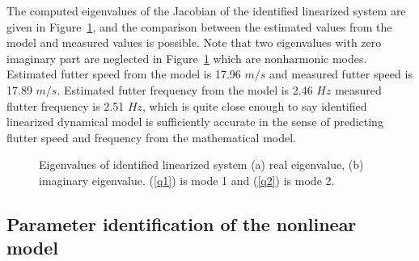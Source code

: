 \documentclass[openacc]{rsproca_new}%
\newcommand{\Fref}[1]{Figure~\ref{#1}}
\begin{document}
The computed eigenvalues of the Jacobian of the identified linearized system are given in \Fref{f:7}, and the comparison between the estimated values from the model and measured values is possible. Note that two eigenvalues with zero imaginary part are neglected in \Fref{f:7} which are nonharmonic modes. Estimated futter speed from the model is 17.96 $m/s$ and measured futter speed is 17.89 $m/s$. Estimated futter frequency from the model is 2.46 $Hz$ measured flutter frequency is 2.51 $Hz$, which is quite close enough to say identified linearized dynamical model is sufficiently accurate in the sense of predicting flutter speed and frequency from the mathematical model.

\begin{figure}
  \centering
\caption{Eigenvalues of identified linearized system (a) real eigenvalue, (b) imaginary eigenvalue. (\ref{q1}) is mode 1 and (\ref{q2}) is mode 2.}
\label{f:7}
\end{figure}

\subsection{Parameter identification of the nonlinear model}\label{nonlinear}
\end{document}
